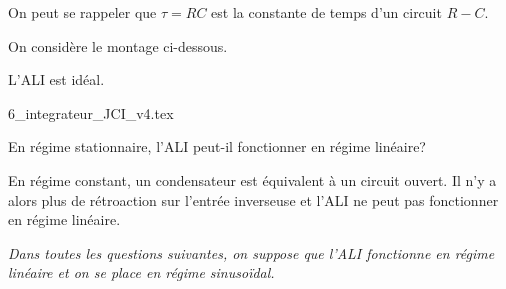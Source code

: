 \begin{corrige}
On peut se rappeler que \(\tau = RC\) est la constante de temps d’un circuit \(R-C\).
\end{corrige}



\finEntrainement




\hauteurLargeurCadreReponse		{8mm}{3.5cm}
\initialisationEntrainement

\debutEntrainement


On considère le montage ci-dessous. 

L’ALI est idéal.

\begin{center}
  \shorthandoff{!:}
  {6_integrateur_JCI_v4.tex}
  \shorthandon{!:}
\end{center}


\begin{enonce}
  En régime stationnaire, l’ALI peut-il fonctionner en régime linéaire?
\end{enonce}
\begin{corrige}
  En régime constant, un condensateur est équivalent à un circuit ouvert. Il n’y a alors plus de rétroaction sur l’entrée inverseuse et l’ALI ne peut pas fonctionner en régime linéaire.
\end{corrige}

\bigskip

{\itshape
Dans toutes les questions suivantes, on suppose  que l’ALI fonctionne en régime linéaire et on se place en régime sinusoïdal.}


